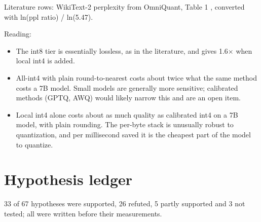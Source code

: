 \documentclass[11pt,a4paper]{article}
\newcommand{\x}{\ensuremath{\times}}
\begin{document}
Literature rows: WikiText-2 perplexity from OmniQuant, Table 1 \citep{shao2024omniquant}, converted with ln(ppl ratio) / ln(5.47).

Reading:

\begin{itemize}
\item
  The int8 tier is essentially lossless, as in the literature, and gives 1.6\x{} when local int4 is added.
\item
  All-int4 with plain round-to-nearest costs about twice what the same method costs a 7B model. Small models are generally more sensitive; calibrated methods (GPTQ, AWQ) would likely narrow this and are an open item.
\item
  Local int4 alone costs about as much quality as calibrated int4 on a 7B model, with plain rounding. The per-byte stack is unusually robust to quantization, and per millisecond saved it is the cheapest part of the model to quantize.
\end{itemize}

\section{Hypothesis ledger}\label{hypothesis-ledger}

33 of 67 hypotheses were supported, 26 refuted, 5 partly supported and 3 not tested; all were written before their measurements.
\end{document}
